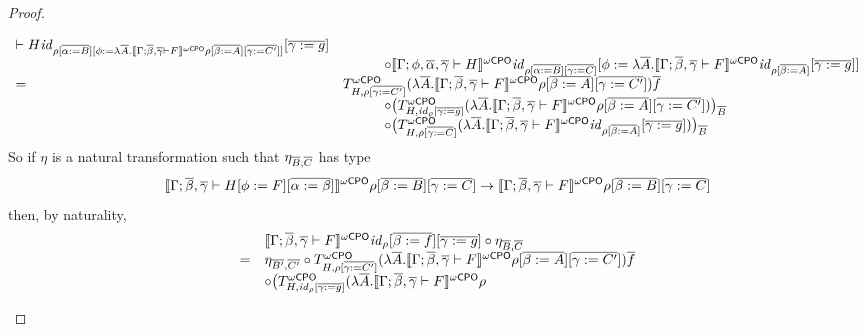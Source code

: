 \documentclass[acmsmall,review,anonymous]{acmart}
\theoremstyle{definition}
\renewcommand{\id}{\mathit{id}}
\begin{document}
\begin{proof}
\begin{itemize}
\[\begin{array}{ll}
{  \vdash H} \id_{\rho [\ol{\alpha := B}][\phi := \lambda
    \ol{A}. \oCPOsem{\Gamma; \ol{\beta}, \ol{\gamma} \vdash F} \rho
       [\ol{\beta := A}] [\ol{\gamma := C'}]]} [\ol{\gamma := g}] \\
&\hspace{3em} \circ \oCPOsem{\Gamma; \phi, \ol{\alpha}, \ol{\gamma}
  \vdash H} \id_{\rho [\ol{\alpha := B}] [\ol{\gamma := C}]} [\phi :=
  \lambda \ol{A}. \oCPOsem{\Gamma; \ol{\beta}, \ol{\gamma} \vdash F}
  \id_{\rho [\ol{\beta := A}]} [\ol{\gamma := g}]] \\
= & T^{\oCPO}_{H,\rho [\ol{\gamma := C'}]} (\lambda
\ol{A}. \oCPOsem{\Gamma; \ol{\beta}, \ol{\gamma} \vdash F} \rho
   [\ol{\beta := A}] [\ol{\gamma := C'}]) \ol{f} \\
&\hspace{3em} \circ \big( T^{\oCPO}_{H,\id_{\rho}[\ol{\gamma := g}]}
   (\lambda \ol{A}. \oCPOsem{\Gamma; \ol{\beta}, \ol{\gamma} \vdash F}
   \rho [\ol{\beta := A}] [\ol{\gamma := C'}]) \big)_{\ol{B}} \\
&\hspace{3em} \circ \big( T^{\oCPO}_{H,\rho [\ol{\gamma := C}]} (\lambda
   \ol{A}. \oCPOsem{\Gamma; \ol{\beta}, \ol{\gamma} \vdash F} \id_{\rho
     [\ol{\beta := A}]} [\ol{\gamma := g}]) \big)_{\ol{B}}
\end{array}\]
So if $\eta$ is a natural transformation such that $\eta_{\overline{B}, \overline{C}}$ has type
\[
\llbracket{\Gamma; \overline{\beta},
  \overline{\gamma} \vdash H[\phi := F][\overline{\alpha := \beta}]}\rrbracket^{{\omega\mathsf{CPO}}}\rho
[\overline{\beta := B}] [\overline{\gamma := C}]
\to
\llbracket{\Gamma; \overline{\beta},
   \overline{\gamma} \vdash F}\rrbracket^{{\omega\mathsf{CPO}}}\rho [\overline{\beta := B}] [\overline{\gamma := C}]\]
then, by naturality,
\[\begin{array}{ll}
 & \oCPOsem{\Gamma; \ol{\beta}, \ol{\gamma} \vdash F} \id_{\rho}
       [\ol{\beta := f}] [\ol{\gamma := g}] \circ \eta_{\ol{B},
         \ol{C}} \\ 
= & \eta_{\ol{B'}, \ol{C'}} \circ T^{\oCPO}_{H,\rho [\ol{\gamma := C'}]}
(\lambda \ol{A}. \oCPOsem{\Gamma; \ol{\beta}, \ol{\gamma} \vdash F}
\rho [\ol{\beta := A}] [\ol{\gamma := C'}]) \ol{f} \\
& \circ \big( T^{\oCPO}_{H,\id_{\rho}[\ol{\gamma := g}]} (\lambda
\ol{A}. \oCPOsem{\Gamma; \ol{\beta}, \ol{\gamma} \vdash F} \rho

\end{array}\]
\end{itemize}
\end{proof}
\end{document}
